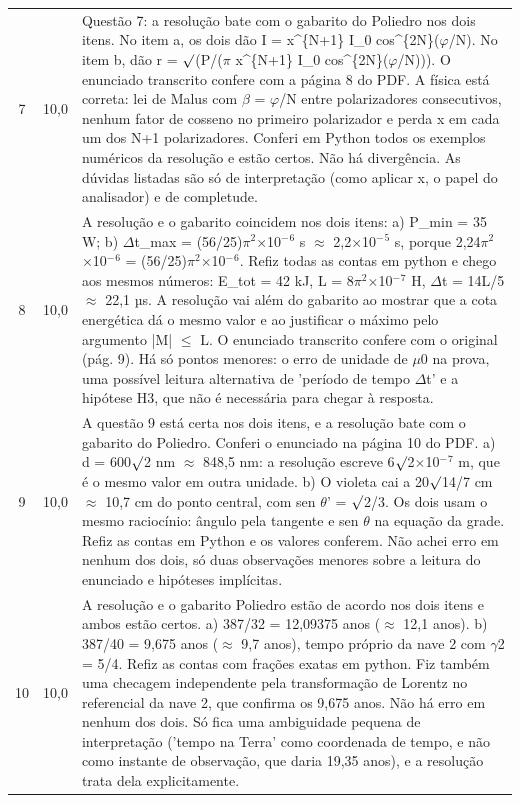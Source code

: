 \documentclass{article}%
\begin{document}
\begin{longtable}{@{}c c p{}@{}}
7 & 10,0 & Questão 7: a resolução bate com o gabarito do Poliedro nos dois itens. No item a, os dois dão I = x\^{}\{N+1\} I\_0 cos\^{}\{2N\}($\varphi$/N). No item b, dão r = $\surd$(P/($\pi$ x\^{}\{N+1\} I\_0 cos\^{}\{2N\}($\varphi$/N))). O enunciado transcrito confere com a página 8 do PDF. A física está correta: lei de Malus com $\beta$ = $\varphi$/N entre polarizadores consecutivos, nenhum fator de cosseno no primeiro polarizador e perda x em cada um dos N+1 polarizadores. Conferi em Python todos os exemplos numéricos da resolução e estão certos. Não há divergência. As dúvidas listadas são só de interpretação (como aplicar x, o papel do analisador) e de completude. \\
8 & 10,0 & A resolução e o gabarito coincidem nos dois itens: a) P\_min = 35 W; b) $\Delta$t\_max = (56/25)$\pi$$^2$$\times$10$^{-}$$^{6}$ s $\approx$ 2,2$\times$10$^{-}$$^{5}$ s, porque 2,24$\pi$$^2$$\times$10$^{-}$$^{6}$ = (56/25)$\pi$$^2$$\times$10$^{-}$$^{6}$. Refiz todas as contas em python e chego aos mesmos números: E\_tot = 42 kJ, L = 8$\pi$$^2$$\times$10$^{-}$$^{7}$ H, $\Delta$t = 14L/5 $\approx$ 22,1 µs. A resolução vai além do gabarito ao mostrar que a cota energética dá o mesmo valor e ao justificar o máximo pelo argumento |M| $\leq$ L. O enunciado transcrito confere com o original (pág. 9). Há só pontos menores: o erro de unidade de $\mu$0 na prova, uma possível leitura alternativa de 'período de tempo $\Delta$t' e a hipótese H3, que não é necessária para chegar à resposta. \\
9 & 10,0 & A questão 9 está certa nos dois itens, e a resolução bate com o gabarito do Poliedro. Conferi o enunciado na página 10 do PDF. a) d = 600$\surd$2 nm $\approx$ 848,5 nm: a resolução escreve 6$\surd$2$\times$10$^{-}$$^{7}$ m, que é o mesmo valor em outra unidade. b) O violeta cai a 20$\surd$14/7 cm $\approx$ 10,7 cm do ponto central, com sen $\theta$' = $\surd$2/3. Os dois usam o mesmo raciocínio: ângulo pela tangente e sen $\theta$ na equação da grade. Refiz as contas em Python e os valores conferem. Não achei erro em nenhum dos dois, só duas observações menores sobre a leitura do enunciado e hipóteses implícitas. \\
10 & 10,0 & A resolução e o gabarito Poliedro estão de acordo nos dois itens e ambos estão certos. a) 387/32 = 12,09375 anos ($\approx$ 12,1 anos). b) 387/40 = 9,675 anos ($\approx$ 9,7 anos), tempo próprio da nave 2 com $\gamma$2 = 5/4. Refiz as contas com frações exatas em python. Fiz também uma checagem independente pela transformação de Lorentz no referencial da nave 2, que confirma os 9,675 anos. Não há erro em nenhum dos dois. Só fica uma ambiguidade pequena de interpretação ('tempo na Terra' como coordenada de tempo, e não como instante de observação, que daria 19,35 anos), e a resolução trata dela explicitamente. \\
\bottomrule\end{longtable}%
\end{document}
